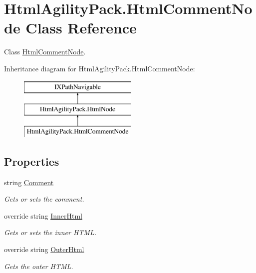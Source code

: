\hypertarget{class_html_agility_pack_1_1_html_comment_node}{}\section{Html\+Agility\+Pack.\+Html\+Comment\+Node Class Reference}
\label{class_html_agility_pack_1_1_html_comment_node}


Class \hyperlink{class_html_agility_pack_1_1_html_comment_node}{Html\+Comment\+Node}.  


Inheritance diagram for Html\+Agility\+Pack.\+Html\+Comment\+Node\+:\begin{figure}[H]
\begin{center}
\leavevmode
\includegraphics[height=3.000000cm]{class_html_agility_pack_1_1_html_comment_node}
\end{center}
\end{figure}
\subsection*{Properties}
\begin{DoxyCompactItemize}
\item 
string \hyperlink{class_html_agility_pack_1_1_html_comment_node_a072305daa4168e586f070629c595e859}{Comment}
\begin{DoxyCompactList}\small\item\em Gets or sets the comment. \end{DoxyCompactList}\item 
override string \hyperlink{class_html_agility_pack_1_1_html_comment_node_adc94c29551cbbdfcccd7b93603a653a4}{Inner\+Html}
\begin{DoxyCompactList}\small\item\em Gets or sets the inner H\+T\+ML. \end{DoxyCompactList}\item 
override string \hyperlink{class_html_agility_pack_1_1_html_comment_node_ae1208290299bbe32fc4e4a75ca37654c}{Outer\+Html}
\begin{DoxyCompactList}\small\item\em Gets the outer H\+T\+ML. \end{DoxyCompactList}\end{DoxyCompactItemize}
